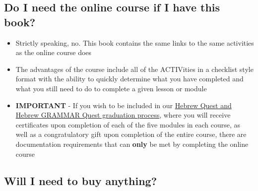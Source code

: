 \documentclass[
]{turabian-researchpaper}
\providecommand{\tightlist}{%
  \setlength{\itemsep}{0pt}\setlength{\parskip}{0pt}}
\begin{document}
\hypertarget{do-i-need-the-online-course-if-i-have-this-book}{%
\subsection*{Do I need the online course if I have this book?}\label{do-i-need-the-online-course-if-i-have-this-book}}

\begin{itemize}
\tightlist
\item
  Strictly speaking, no. This book contains the same links to the same activities as the online course does
\item
  The advantages of the course include all of the ACTIVities in a checklist style format with the ability to quickly determine what you have completed and what you still need to do to complete a given lesson or module
\item
  \textbf{IMPORTANT} - If you wish to be included in our \href{https://holylanguage.com/graduate.html}{Hebrew Quest and Hebrew GRAMMAR Quest graduation process}, where you will receive certificates upon completion of each of the five modules in each course, as well as a congratulatory gift upon completion of the entire course, there are documentation requirements that can \textbf{only} be met by completing the online course
\end{itemize}

\hypertarget{will-i-need-to-buy-anything}{%
\subsection*{Will I need to buy anything?}\label{will-i-need-to-buy-anything}}
\end{document}
